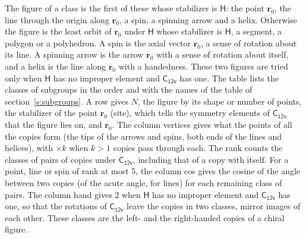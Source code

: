 \documentclass[10pt,a4paper]{article}
\numberwithin{equation}{section}
\newcommand{\grp}[1]{\mathsf{#1}}
\newcommand{\pointr}{\mathbf{r}}
\begin{document}
\leavevmode\label{n:head.figure}The figure of a class is the first of these whose stabilizer is $\grp{H}$: the point $\pointr_0$, the line through the origin along $\pointr_0$, a spin, a spinning arrow and a helix. Otherwise the figure is the least orbit of $\pointr_0$ under $\grp{H}$ whose stabilizer is $\grp{H}$, a segment, a polygon or a polyhedron. A spin is the axial vector $\pointr_0$, a sense of rotation about its line. A spinning arrow is the arrow $\pointr_0$ with a sense of rotation about itself, and a helix is the line along $\pointr_0$ with a handedness. These two figures are tried only when $\grp{H}$ has no improper element and $\grp{C_{12v}}$ has one. The table lists the classes of subgroups in the order and with the names of the table of section~\ref{s:subgroups}. \label{n:head.site}A row gives $N$, the figure by its shape or number of points, the stabilizer of the point $\pointr_0$ (site), which tells the symmetry elements of $\grp{C_{12v}}$ that the figure lies on, and $\pointr_0$. \label{n:head.vertices}The column vertices gives what the points of all the copies form (the tips of the arrows and spins, both ends of the lines and helices), with ${\times}k$ when $k > 1$ copies pass through each. \label{n:head.rank}The rank counts the classes of pairs of copies under $\grp{C_{12v}}$, including that of a copy with itself. \label{n:head.cos}For a point, line or spin of rank at most 5, the column cos gives the cosine of the angle between two copies (of the acute angle, for lines) for each remaining class of pairs. \label{n:head.hand}The column hand gives 2 when $\grp{H}$ has no improper element and $\grp{C_{12v}}$ has one, so that the rotations of $\grp{C_{12v}}$ leave the copies in two classes, mirror images of each other. These classes are the left- and the right-handed copies of a chiral figure.
\end{document}

